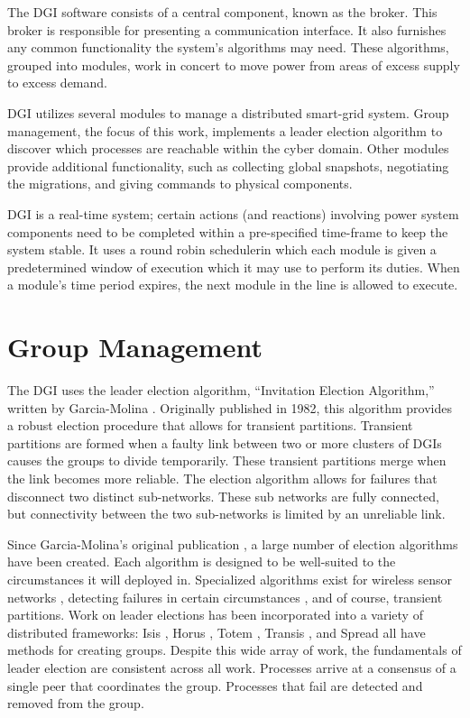 The DGI software consists of a central component, known as the broker.
This broker is responsible for presenting a communication interface.
It also furnishes any common functionality the system's algorithms may need.
These algorithms, grouped into modules, work in concert to move power from areas of excess supply to excess demand.

DGI utilizes several modules to manage a distributed smart-grid system.
Group management, the focus of this work, implements a leader election algorithm to discover which processes are reachable within the cyber domain.
Other modules provide additional functionality, such as collecting global snapshots, negotiating the migrations, and giving commands to physical components.

DGI is a real-time system; certain actions (and reactions) involving power system components need to be completed within a pre-specified time-frame to keep the system stable.
It uses a round robin schedulerin which each module is given a predetermined window of execution which it may use to perform its duties.
When a module's time period expires, the next module in the line is allowed to execute. 
 
\section{Group Management}
The DGI uses the leader election algorithm, ``Invitation Election Algorithm,'' written by Garcia-Molina \cite{INVITATIONELECTION}.
Originally published in 1982, this algorithm provides a robust election  procedure that allows for transient partitions.
Transient partitions are formed when a faulty link between two or more clusters of DGIs causes the groups to divide temporarily.
These transient partitions merge when the link becomes more reliable.
The election algorithm allows for failures that disconnect two distinct sub-networks.
These sub networks are fully connected, but connectivity between the two sub-networks is limited by an unreliable link.

Since Garcia-Molina's original publication \cite{INVITATIONELECTION}, a large number of election algorithms have been created. 
Each algorithm is designed to be well-suited to the circumstances it will deployed in.
Specialized algorithms exist for wireless sensor networks \cite{LE-WSN-1}\cite{LE-WSN-2}, detecting failures in certain circumstances \cite{LE-SPECIALCIRCUMSTANCES-1}\cite{LE-SPECIALCIRCUMSTANCES-2}, and of course, transient partitions.
Work on leader elections has been incorporated into a variety of distributed frameworks: Isis \cite{ISISTOOLKIT}, Horus \cite{HORUSTOOLKIT}, Totem \cite{TOTEMTOOLKIT}, Transis \cite{TRANSISTOOLKIT}, and Spread \cite{SPREADTOOLKIT} all have methods for creating groups.
Despite this wide array of work, the fundamentals of leader election are consistent
across all work.
Processes arrive at a consensus of a single peer that coordinates the group.
Processes that fail are detected and removed from the group. 

